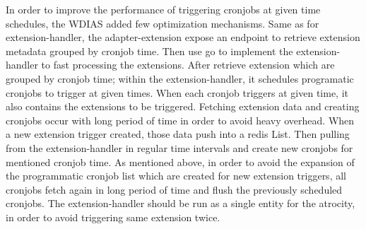 In order to improve the performance of triggering cronjobs at given time schedules, the WDIAS added few optimization mechanisms.
Same as for extension-handler, the adapter-extension expose an endpoint to retrieve extension metadata grouped by cronjob time. Then use \acrshort{go} to implement the extension-handler to fast processing the extensions. After retrieve extension which are grouped by cronjob time; within the extension-handler, it schedules programatic cronjobs to trigger at given times. When each cronjob triggers at given time, it also contains the extensions to be triggered. Fetching extension data and creating cronjobs occur with long period of time in order to avoid heavy overhead.
When a new extension trigger created, those data push into a \acrshort{redis} List. Then pulling from the extension-handler in regular time intervals and create new cronjobs for mentioned cronjob time.
As mentioned above, in order to avoid the expansion of the programmatic cronjob list which are created for new extension triggers, all cronjobs fetch again in long period of time and flush the previously scheduled cronjobs.
The extension-handler should be run as a single entity for the atrocity, in order to avoid triggering same extension twice.